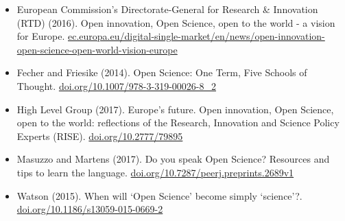 \documentclass{article}
\begin{document}
\begin{itemize}
\item European Commission's Directorate-General for Research \& Innovation (RTD) (2016). Open innovation, Open Science, open to the world - a vision for Europe. \href{https://ec.europa.eu/digital-single-market/en/news/open-innovation-open-science-open-world-vision-europe}{ec.europa.eu/digital-single-market/en/news/open-innovation-open-science-open-world-vision-europe}


\item Fecher and Friesike (2014). Open Science: One Term, Five Schools of Thought. \href{https://doi.org/10.1007/978-3-319-00026-8_2}{doi.org/10.1007/978-3-319-00026-8\_2}


\item High Level Group (2017). Europe's future. Open innovation, Open Science, open to the world: reflections of the Research, Innovation and Science Policy Experts (RISE). \href{https://doi.org/10.2777/79895}{doi.org/10.2777/79895}


\item Masuzzo and Martens (2017). Do you speak Open Science? Resources and tips to learn the language. \href{https://doi.org/10.7287/peerj.preprints.2689v1}{doi.org/10.7287/peerj.preprints.2689v1}


\item Watson (2015). When will ‘Open Science’ become simply ‘science’?. \href{https://doi.org/10.1186/s13059-015-0669-2}{doi.org/10.1186/s13059-015-0669-2}


\end{itemize}
\end{document}

